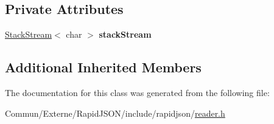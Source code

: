 \subsection*{Private Attributes}
\begin{DoxyCompactItemize}
\item 
\hyperlink{class_generic_reader_1_1_stack_stream}{Stack\+Stream}$<$ char $>$ {\bfseries stack\+Stream}\hypertarget{class_generic_reader_1_1_number_stream_3_01_input_stream_00_01true_01_4_a0634b872f41010e4690c96b4fd69a75e}{}\label{class_generic_reader_1_1_number_stream_3_01_input_stream_00_01true_01_4_a0634b872f41010e4690c96b4fd69a75e}

\end{DoxyCompactItemize}
\subsection*{Additional Inherited Members}


The documentation for this class was generated from the following file\+:\begin{DoxyCompactItemize}
\item 
Commun/\+Externe/\+Rapid\+J\+S\+O\+N/include/rapidjson/\hyperlink{reader_8h}{reader.\+h}\end{DoxyCompactItemize}
